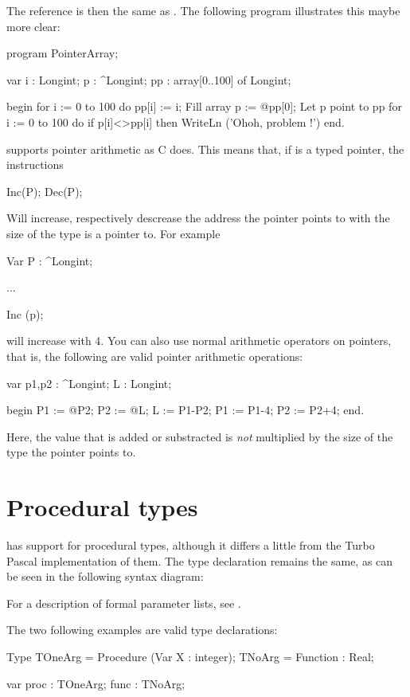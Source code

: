 \documentclass{report}
\begin{document}
The reference  is then the same as . The following program
illustrates this maybe more clear:
\begin{listing}
program PointerArray;

var i : Longint;
    p : ^Longint;
    pp : array[0..100] of Longint;  

begin
  for i := 0 to 100 do pp[i] := i; { Fill array }
  p := @pp[0];                     { Let p point to pp }
  for i := 0 to 100 do 
    if p[i]<>pp[i] then 
      WriteLn ('Ohoh, problem !')
end.
\end{listing}

\fpc supports pointer arithmetic as C does. This means that, if  is a
typed pointer, the instructions
\begin{listing}
Inc(P);
Dec(P);
\end{listing}
Will increase, respectively descrease the address the pointer points to
with the size of the type  is a pointer to. For example
\begin{listing}
Var P : ^Longint;

...

 Inc (p);
\end{listing}
will increase  with 4.
You can also use normal arithmetic operators on pointers, that is, the
following are valid pointer arithmetic operations:
\begin{listing}
var  p1,p2 : ^Longint;
     L : Longint;

begin
  P1 := @P2;
  P2 := @L;
  L := P1-P2;
  P1 := P1-4;
  P2 := P2+4;
end.
\end{listing}
Here, the value that is added or substracted is {\em not} multiplied by the 
size of the type the pointer points to.

\section{Procedural types}
\fpc has support for procedural types, although it differs a little from 
the Turbo Pascal implementation of them. The type declaration remains the
same, as can be seen in the following syntax diagram:



For a description of formal parameter lists, see .

The two following examples are valid type declarations:
\begin{listing}
Type TOneArg = Procedure (Var X : integer);
     TNoArg = Function : Real;

var proc : TOneArg;
    func : TNoArg;
\end{listing}
\end{document}
